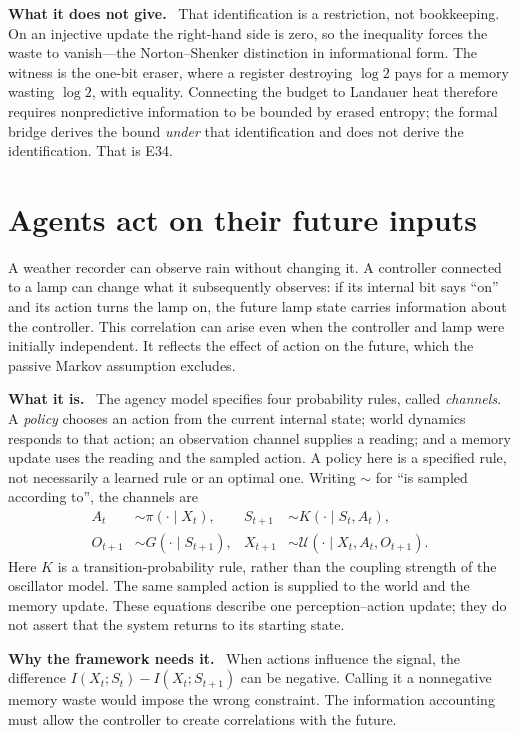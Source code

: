 \documentclass[11pt]{article}
\newcommand{\what}{\par\smallskip\noindent\textbf{What it is.}\ }
\newcommand{\why}{\par\smallskip\noindent\textbf{Why the framework needs it.}\ }
\newcommand{\scope}{\par\smallskip\noindent\textbf{What it does not give.}\ }
\begin{document}
\scope
That identification is a restriction, not bookkeeping. On an injective update
the right-hand side is zero, so the inequality forces the waste to vanish---the
Norton--Shenker distinction in informational form. The witness is the one-bit
eraser, where a register destroying $\log 2$ pays for a memory wasting
$\log 2$, with equality. Connecting the budget to Landauer heat therefore
requires nonpredictive information to be bounded by erased entropy; the formal
bridge derives the bound \emph{under} that identification and does not derive
the identification. That is E34.

\section{Agents act on their future inputs}
\label{sec:agency}

A weather recorder can observe rain without changing it. A controller connected
to a lamp can change what it subsequently observes: if its internal bit says
``on'' and its action turns the lamp on, the future lamp state carries
information about the controller. This correlation can arise even when the
controller and lamp were initially independent. It reflects the effect of
action on the future, which the passive Markov assumption excludes.

\what
The agency model specifies four probability rules, called \emph{channels}.
A \emph{policy} chooses an action from the current internal state; world
dynamics responds to that action; an observation channel supplies a reading;
and a memory update uses the reading and the sampled action. A policy here is
a specified rule, not necessarily a learned rule or an optimal one.
Writing $\sim$ for ``is sampled according to'', the channels are
\begin{align*}
 A_t&\sim\pi(\cdot\mid X_t),&
 S_{t+1}&\sim K(\cdot\mid S_t,A_t),\\
 O_{t+1}&\sim G(\cdot\mid S_{t+1}),&
 X_{t+1}&\sim \mathcal{U}(\cdot\mid X_t,A_t,O_{t+1}).
\end{align*}
Here $K$ is a transition-probability rule, rather than the coupling strength
of the oscillator model. The same sampled action is supplied to the world
and the memory update. These equations describe one perception--action update;
they do not assert that the system returns to its starting state.

\why
When actions influence the signal, the difference
$I(X_t;S_t)-I(X_t;S_{t+1})$ can be negative. Calling it a nonnegative memory
waste would impose the wrong constraint. The information accounting must
allow the controller to create correlations with the future.
\end{document}
